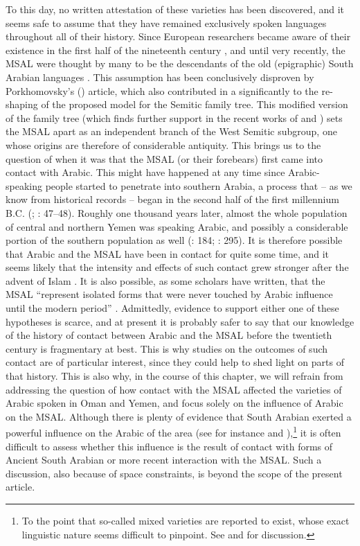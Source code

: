 \documentclass[output=paper]{langsci/langscibook}
\begin{document}
To this day, no written attestation of these varieties has been discovered, and it seems safe to assume that they have remained exclusively spoken languages throughout all of their history. Since European researchers became aware of their existence in the first half of the nineteenth century \citep{Wellsted1837}, and until very recently, the MSAL were thought by many to be the descendants of the old (epigraphic) South Arabian languages \citep[16]{Rubin2014}. This assumption has been conclusively disproven by Porkhomovsky’s (\citeyear{Porkhomovsky1997}) article, which also contributed in a significantly to the re-shaping of the proposed model for the Semitic family tree. This modified version of the family tree (which finds further support in the recent works of \citealt{Kogan2015} and \citealt{Edzard2017}) sets the MSAL apart as an independent branch of the West Semitic subgroup, one whose origins are therefore of considerable antiquity. This brings us to the question of when it was that the MSAL (or their forebears) first came into contact with Arabic. This might have happened at any time since Arabic-speaking people started to penetrate into southern Arabia, a process that – as we know from historical records – began in the second half of the first millennium B.C. (\citealt{Robin1991}; \citealt{Hoyland2001}: 47--48). Roughly one thousand years later, almost the whole population of central and northern Yemen was speaking Arabic, and possibly a considerable portion of the southern population as well (\citealt{Beeston1981}: 184; \citealt{Zammit2011}: 295). It is therefore possible that Arabic and the MSAL have been in contact for quite some time, and it seems likely that the intensity and effects of such contact grew stronger after the advent of Islam \citep[247]{Lonnet2011}. It is also possible, as some scholars have written, that the MSAL “represent isolated forms that were never touched by Arabic influence until the modern period” \citep[127]{Versteegh2014book}. Admittedly, evidence to support either one of these hypotheses is scarce, and at present it is probably safer to say that our knowledge of the history of contact between Arabic and the MSAL before the twentieth century is fragmentary at best. This is why studies on the outcomes of such contact are of particular interest, since they could help to shed light on parts of that history. This is also why, in the course of this chapter, we will refrain from addressing the question of how contact with the MSAL affected the varieties of Arabic spoken in Oman and Yemen, and focus solely on the influence of Arabic on the MSAL. Although there is plenty of evidence that South Arabian exerted a powerful influence on the Arabic of the area (see for instance \citealt{Retsö2000} and \citealt{Watson2018}),\footnote{To the point that so-called mixed varieties are reported to exist, whose exact linguistic nature seems difficult to pinpoint. See \citet{WatsonEtAl2006} and \citet{Watson2011SAYemeni} for discussion.} it is often difficult to assess whether this influence is the result of contact with forms of Ancient South Arabian or more recent interaction with the MSAL. Such a discussion, also because of space constraints, is beyond the scope of the present article.
\end{document}

